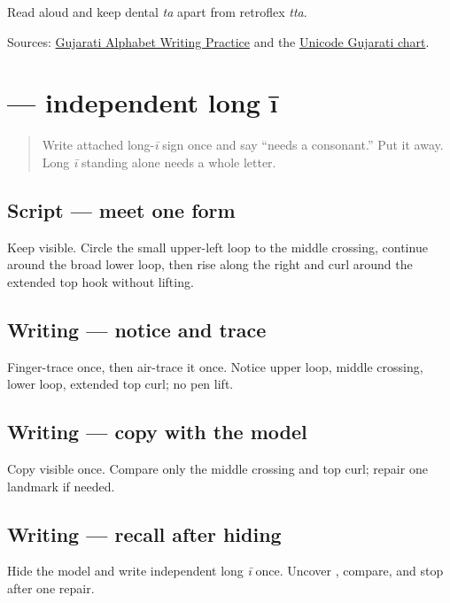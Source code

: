 \begin{tcolorbox}[breakable,colback=teal!4,colframe=teal!35!black,title={Before you move on}]
Read \textbf{ } aloud and keep dental \emph{ta} apart from retroflex \emph{tta}.

Sources: \href{https://www.t30apps.com/gujarati-alphabet-writing/}{Gujarati Alphabet Writing Practice} and the \href{https://www.unicode.org/charts/PDF/U0A80.pdf}{Unicode Gujarati chart}.
\end{tcolorbox}
\section[\texorpdfstring{\gu{ઈ} (ī)}{ઈ (ī)}]{ — independent long ī}

\label{lesson:GU-W07-independent-ii}



\begin{quote}
Write attached long-\emph{ī} sign \textbf{} once and say “needs a consonant.” Put it away. Long \emph{ī} standing alone needs a whole letter.
\end{quote}

\subsection*{Script — meet one form}
Keep \textbf{} visible. Circle the small upper-left loop to the middle crossing, continue around the broad lower loop, then rise along the right and curl around the extended top hook without lifting.

\subsection*{Writing — notice and trace}

Finger-trace \textbf{} once, then air-trace it once. Notice upper loop, middle crossing, lower loop, extended top curl; no pen lift.

\subsection*{Writing — copy with the model}
Copy visible \textbf{} once. Compare only the middle crossing and top curl; repair one landmark if needed.

\subsection*{Writing — recall after hiding}
Hide the model and write independent long \emph{ī} once. Uncover \textbf{}, compare, and stop after one repair.


